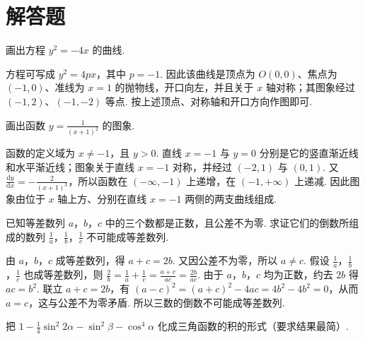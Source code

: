 \section{解答题}

\begin{problem}

画出方程 \(y^{2} = -4x \) 的曲线.
\end{problem}

\begin{solution}
方程可写成 \(y^{2}=4px\)，其中 \(p=-1\). 因此该曲线是顶点为 \(O(0,0)\)、焦点为 \((-1,0)\)、准线为 \(x=1\) 的抛物线，开口向左，并且关于 \(x\) 轴对称；其图象经过 \((-1,2)\)、\((-1,-2)\) 等点. 按上述顶点、对称轴和开口方向作图即可.
\end{solution}

\begin{problem}

画出函数 \(y = \frac{1}{(x + 1)^2} \) 的图象.
\end{problem}

\begin{solution}
函数的定义域为 \(x\ne-1\)，且 \(y>0\). 直线 \(x=-1\) 与 \(y=0\) 分别是它的竖直渐近线和水平渐近线；图象关于直线 \(x=-1\) 对称，并经过 \((-2,1)\) 与 \((0,1)\). 又 \(\displaystyle\frac{\mathrm{d}y}{\mathrm{d}x}=-\frac{2}{(x+1)^{3}}\)，所以函数在 \((-\infty,-1)\) 上递增，在 \((-1,+\infty)\) 上递减. 因此图象由位于 \(x\) 轴上方、分别在直线 \(x=-1\) 两侧的两支曲线组成.
\end{solution}

\begin{problem}

已知等差数列 \(a\)，\(b\)，\(c\) 中的三个数都是正数，且公差不为零. 求证它们的倒数所组成的数列 \(\frac{1}{a}\)，\(\frac{1}{b}\)，\(\frac{1}{c}\) 不可能成等差数列.
\end{problem}

\begin{solution}
由 \(a\)，\(b\)，\(c\) 成等差数列，得 \(a+c=2b\). 又因公差不为零，所以 \(a\ne c\). 假设 \(\frac{1}{a}\)，\(\frac{1}{b}\)，\(\frac{1}{c}\) 也成等差数列，则 \(\displaystyle\frac{2}{b}=\frac{1}{a}+\frac{1}{c}=\frac{a+c}{ac}=\frac{2b}{ac}\). 由于 \(a\)，\(b\)，\(c\) 均为正数，约去 \(2b\) 得 \(ac=b^{2}\). 联立 \(a+c=2b\)，有 \(\displaystyle(a-c)^{2}=(a+c)^{2}-4ac=4b^{2}-4b^{2}=0\)，从而 \(a=c\)，这与公差不为零矛盾. 所以三数的倒数不可能成等差数列.
\end{solution}

\begin{problem}

把 \(1 - \frac{1}{4}\sin^2 2\alpha -\sin^2\beta -\cos^4\alpha\) 化成三角函数的积的形式（要求结果最简）.
\end{problem}

